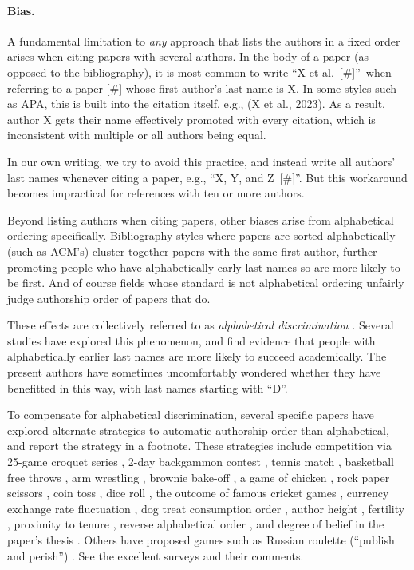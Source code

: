 \documentclass[natbib,authoryear]{sigtbd17-style}
\begin{document}
\paragraph{Bias.}

A fundamental limitation to \emph{any} approach that lists the authors
in a fixed order arises when citing papers with several authors.
In the body of a paper (as opposed to the bibliography), it is most common
to write ``X et al.~[\#]''\ when referring to a paper [\#]
whose first author's last name is X.
In some styles such as APA, this is built into the citation itself,
e.g., (X et al., 2023).
As a result, author X gets their name effectively promoted with every citation,
which is inconsistent with multiple or all authors being equal.

In our own writing, we try to avoid this practice, and instead
write all authors' last names whenever citing a paper,
e.g., ``X, Y, and Z~[\#]''.
But this workaround becomes impractical for references with ten or more authors.

Beyond listing authors when citing papers,
other biases arise from alphabetical ordering specifically.
Bibliography styles where papers are sorted alphabetically (such as ACM's)
cluster together papers with the same first author, further promoting people
who have alphabetically early last names so are more likely to be first.
And of course fields whose standard is not alphabetical ordering
unfairly judge authorship order of papers that do.

These effects are collectively referred to as
\emph{alphabetical discrimination} \cite{alphabetical-discrimination}.
Several studies have explored this phenomenon, and find evidence that
people with alphabetically earlier last names are more likely to succeed
academically.
The present authors have sometimes uncomfortably wondered whether they have
benefitted in this way, with last names starting with ``D''.

To compensate for alphabetical discrimination,
several specific papers have explored alternate strategies
to automatic authorship order than alphabetical,
and report the strategy in a footnote.
These strategies include competition via
25-game croquet series \cite{croquet},
2-day backgammon contest \cite{backgammon},
tennis match \cite{tennis},
basketball free throws \cite{free-throws},
arm wrestling \cite{arm-wrestling},
brownie bake-off \cite{brownie-bakeoff},
a game of chicken \cite{chicken},
rock paper scissors \cite{rock-paper-scissors},
coin toss \cite{coin-toss},
dice roll \cite{dice},
the outcome of famous cricket games \cite{cricket},
currency exchange rate fluctuation \cite{currency-fluctuation},
dog treat consumption order \cite{dog},
author height \cite{height},
fertility \cite{fertility},
proximity to tenure \cite{tenure-proximity},
reverse alphabetical order \cite{reverse-alphabetical},
and degree of belief in the paper's thesis \cite{belief}.
Others have proposed games such as Russian roulette
(``publish and perish'') \cite{publish-and-perish}.
See the excellent surveys \cite{survey1,survey2,survey3}
and their comments.
\end{document}
